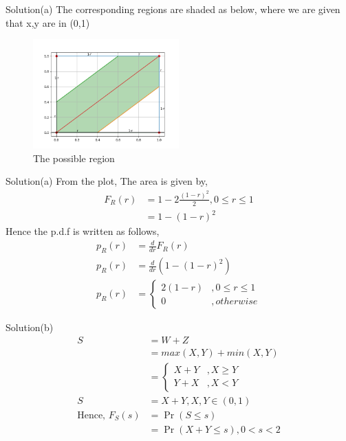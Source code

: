 \documentclass{beamer}
\providecommand{\pr}[1]{\ensuremath{\Pr\left(#1\right)}}
\theoremstyle{remark}
\numberwithin{equation}{subsection}
\begin{document}
\begin{frame}{Solution(a)}
    The corresponding regions are shaded as below, where we are given that x,y are in (0,1)
    \begin{figure}[h]
        \centering
        \includegraphics[width = 0.5\textwidth]{plot1.png}
        \caption{The possible region}
        \label{fig:my_label}
    \end{figure}
\end{frame}

\begin{frame}{Solution(a)}
    From the plot, The area is given by,
    \begin{align}
        F_R(r) &= 1 - 2\frac{(1-r)^2}{2}, 0 \leq r \leq 1 \\
        &= 1 - (1-r)^2
    \end{align}
    Hence the p.d.f is written as follows,
    \begin{align}
        p_R(r) &= \frac{d}{dr} F_R(r) \\
        p_R(r) &= \frac{d}{dr} (1 - (1-r)^2) \\
        p_R(r) &= \begin{cases} 2(1-r) &, 0 \leq r \leq 1 \\
       0 &, otherwise\end{cases}
    \end{align}
\end{frame}

\begin{frame}{Solution(b)}
    \begin{align}
        S &= W+Z \\
        &= max(X, Y) + min(X, Y) \\
        &= \begin{cases} X+Y &, X \geq Y \\
        Y + X &, X < Y\end{cases} \\
        S &= X+Y, X,Y \in (0, 1) \\
        \text{Hence, } F_S(s) &= \pr{S \leq s} \\
        &= \pr{X+Y \leq s}, 0 < s < 2 \\
    \end{align}
\end{frame}
\end{document}
